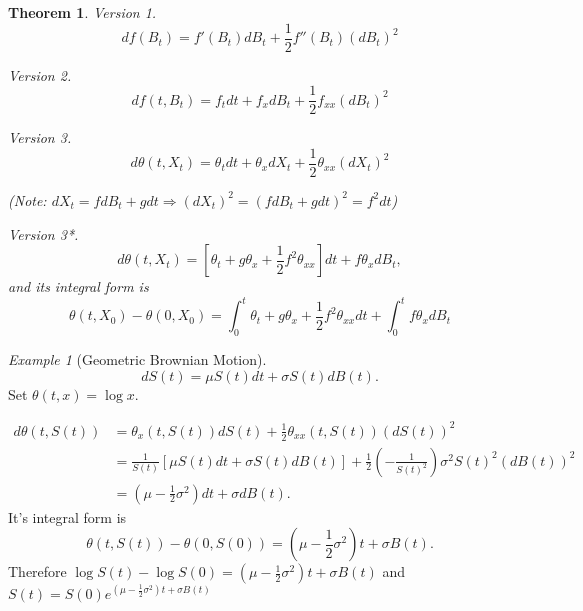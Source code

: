 \documentclass[12pt]{report}
\renewcommand{\1}{\mathbb{1}}
\theoremstyle{break}
\newtheorem{thm}{Theorem}[section] %
\theoremstyle{newdef}
\theoremstyle{remark}
\newtheorem*{exmp}{Example} %
\begin{document}
\begin{thm}
Version 1.
$$df(B_t) = f'(B_t)dB_t + \frac12 f''(B_t)(dB_t)^2$$

Version 2.
$$df(t,B_t) = f_tdt + f_xdB_t + \frac12 f_{xx} (dB_t)^2$$

Version 3.
$$d\theta(t,X_t) = \theta_t dt + \theta_x dX_t + \frac12 \theta_{xx}(dX_t)^2$$

\hspace{4mm}(Note: $dX_t = fdB_t + gdt \Rightarrow (dX_t)^2 = (fdB_t + gdt)^2 = f^2dt$)

Version 3*.
$$d\theta(t,X_t) = [\theta_t + g\theta_x + \frac12 f^2 \theta_{xx}]dt + f\theta_x dB_t,$$
and its integral form is
$$
\theta(t,X_0) - \theta(0,X_0)
= \int_0^t \theta_t + g\theta_x + \frac12 f^2 \theta_{xx} dt + \int_0^t f\theta_x dB_t
$$


\end{thm}



\begin{exmp}[Geometric Brownian Motion]
$$dS(t) = \mu S(t)dt + \sigma S(t) dB(t).$$
Set $\theta(t,x) = \log x$.

$$
\begin{aligned}
d\theta(t,S(t))
&= \theta_x(t,S(t))dS(t) + \frac12 \theta_{xx}(t,S(t))(dS(t))^2\\
&= \frac{1}{S(t)} \left[\mu S(t)dt + \sigma S(t)dB(t)\right] + \frac12(-\frac{1}{S(t)^2})\sigma^2 S(t)^2 (dB(t))^2\\
&= (\mu-\frac12\sigma^2)dt + \sigma dB(t).
\end{aligned}
$$
It's integral form is
$$\theta(t,S(t)) - \theta(0,S(0)) = (\mu - \frac12\sigma^2)t + \sigma B(t).$$
Therefore $\log S(t) - \log S(0) = (\mu-\frac12 \sigma^2)t + \sigma B(t)$ and
$S(t) = S(0) e^{(\mu-\frac12\sigma^2)t + \sigma B(t)}$
\end{exmp}

\vspace{5mm}
\end{document}
